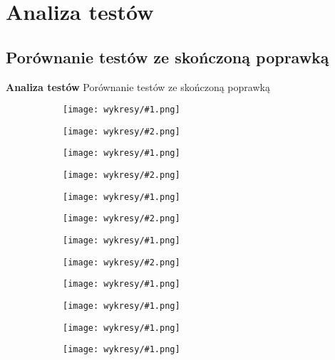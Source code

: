 \documentclass{beamer}
\newcommand{\1}[1]{\mathds{1}\left(#1\right)}
\newenvironment{subdiagrams}[2]{
	\begin{subfigure}{.35\textwidth}
		\centering
		\texttt{[image: wykresy/\#1.png]}
		\caption{}
		\label{#1}
	\end{subfigure}
	\begin{subfigure}{.35\textwidth}
		\centering
		\texttt{[image: wykresy/\#2.png]}
		\caption{}
		\label{#2}
	\end{subfigure}
} {}
\newenvironment{subdiagram}[1]{
	\begin{subfigure}{.45\textwidth}
		\centering
		\texttt{[image: wykresy/\#1.png]}
		\caption{}
		\label{#1}
	\end{subfigure}
} {}
\begin{document}
\section{Analiza testów}
\subsection{Porównanie testów ze skończoną poprawką}
\begin{frame}
\begin{alertblock}{\centering \Huge \textbf{Analiza testów}} 
	\Large \centering Porównanie testów ze skończoną poprawką
\end{alertblock}
\end{frame}

\begin{frame}
\begin{figure}[p]	
	\caption{Prawdopodobieństwo błędu I~rodzaju testów~Z i~E jako funkcja rozmiaru próbki~$n$; $\alpha=0.05$; $N_1=N_2=100$}
	\begin{subdiagrams}{sizeZE_p_0_1}{sizeZE_p_0_1_n1_10}
	\end{subdiagrams}
	
	\begin{subdiagrams}{sizeZE_p_0_3}{sizeZE_p_0_3_n1_5}
	\end{subdiagrams}
\end{figure}
\end{frame}

\begin{frame}
	\begin{figure}[p]
		\caption{Prawdopodobieństwo błędu I~rodzaju testów~Z i~E jako funkcja proporcji $p=M_1/N_1=M_2/N_2$; $\alpha=0.05$; $N_1=N_2=100$}
		\begin{subdiagrams}{sizeZE_n_20}{sizeZE_n1_20_n2_5}
		\end{subdiagrams}
		
		\begin{subdiagrams}{sizeZE_n_30}{sizeZE_n1_30_n2_15}
		\end{subdiagrams}
	\end{figure}
\end{frame}

\begin{frame}
	\begin{figure}[p]
		\caption{Moc testów~Z i~E jako funkcja rozmiaru próbki $n$}
		\label{powerZE_n1}
		\begin{subdiagram}{powerZE_N1_30_N2_50_p_0_6}
		\end{subdiagram}
		\begin{subdiagram}{powerZE_N_100_p_0_1}
		\end{subdiagram}
		\begin{subdiagram}{powerZE_N1_100_N2_200_p_0_1}
		\end{subdiagram}
		\begin{subdiagram}{powerZE_N1_3000_N2_100_p_0_6}
		\end{subdiagram}
	\end{figure}
\end{frame}
\end{document}
